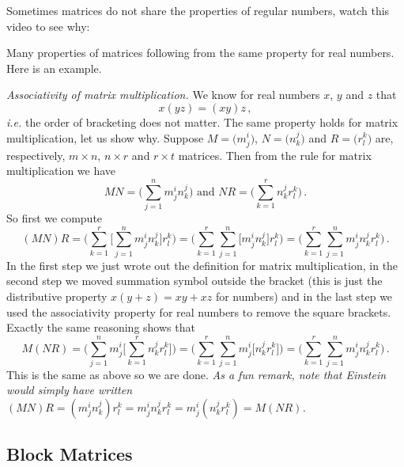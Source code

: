 Sometimes matrices do not share the properties of regular numbers, watch this video to see why:


Many properties of matrices following from the same property for real numbers. Here is an example.

\begin{example}
{\itshape Associativity of matrix multiplication.} We know for real numbers $x$, $y$ and $z$ that 
\[
x(yz)=(xy)z\, ,
\]
{\itshape i.e.} the order of bracketing does not matter. The same property holds for matrix multiplication, let us show why.
Suppose $M=\big( m^i_j \big)$, $N=\big( n^j_k \big)$ and  $R=\big( r^k_l \big)$ are, 
respectively, $m\times n$, $n\times r$ and $r\times t$ matrices. Then from the rule for matrix
multiplication we have
\[
MN=\Big(\sum_{j=1}^n m^i_j n^j_k\Big)\mbox{ and } NR=\Big(\sum_{k=1}^r n^j_k r^k_l\Big)\, .
\]
So first we compute 
\[
(MN)R=\Big(\sum_{k=1}^r \Big[\sum_{j=1}^n m^i_j n^j_k\Big] r^k_l \Big) = 
\Big(\sum_{k=1}^r \sum_{j=1}^n \Big[ m^i_j n^j_k\Big] r^k_l \Big) =\Big(\sum_{k=1}^r \sum_{j=1}^n m^i_j n^j_k r^k_l \Big)\, .
\]
In the first step we just wrote out the definition for matrix multiplication, in the second step we
moved summation symbol outside the bracket (this is just the distributive
property $x(y+z)=xy+xz$ for numbers) and
in the last step we used the associativity property for real numbers to remove the square brackets. 
Exactly the same reasoning shows that
\[
M(NR)=\Big(\sum_{j=1}^n m^i_j\Big[\sum_{k=1}^r n^j_k r^k_l\Big]\Big) = 
\Big(\sum_{k=1}^r \sum_{j=1}^n  m^i_j \Big[n^j_kr^k_l \Big] \Big) =\Big(\sum_{k=1}^r \sum_{j=1}^n m^i_j n^j_k r^k_l \Big)\, .
\]
This is the same as above so we are done. {\itshape As a fun remark, note that Einstein would simply have written
$(MN)R=(m^i_j n^j_k) r^k_l= m^i_j n^j_k r^k_l = m^i_j (n^j_k r^k_l ) = M(NR)$.}
\end{example}


\subsection{Block Matrices}

